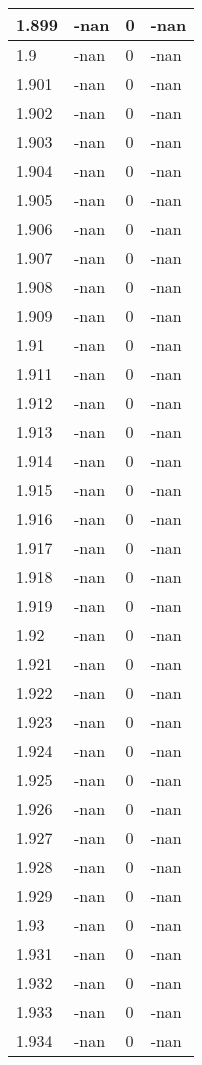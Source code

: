 \documentclass[a4paper,14pt]{extarticle}
\begin{document}
\begin{longtable}{||m{3cm}||m{3cm}|m{3cm}||m{3cm}||}
\hline
1.899 & -nan & 0 & -nan\\
\hline
1.9 & -nan & 0 & -nan\\
\hline
1.901 & -nan & 0 & -nan\\
\hline
1.902 & -nan & 0 & -nan\\
\hline
1.903 & -nan & 0 & -nan\\
\hline
1.904 & -nan & 0 & -nan\\
\hline
1.905 & -nan & 0 & -nan\\
\hline
1.906 & -nan & 0 & -nan\\
\hline
1.907 & -nan & 0 & -nan\\
\hline
1.908 & -nan & 0 & -nan\\
\hline
1.909 & -nan & 0 & -nan\\
\hline
1.91 & -nan & 0 & -nan\\
\hline
1.911 & -nan & 0 & -nan\\
\hline
1.912 & -nan & 0 & -nan\\
\hline
1.913 & -nan & 0 & -nan\\
\hline
1.914 & -nan & 0 & -nan\\
\hline
1.915 & -nan & 0 & -nan\\
\hline
1.916 & -nan & 0 & -nan\\
\hline
1.917 & -nan & 0 & -nan\\
\hline
1.918 & -nan & 0 & -nan\\
\hline
1.919 & -nan & 0 & -nan\\
\hline
1.92 & -nan & 0 & -nan\\
\hline
1.921 & -nan & 0 & -nan\\
\hline
1.922 & -nan & 0 & -nan\\
\hline
1.923 & -nan & 0 & -nan\\
\hline
1.924 & -nan & 0 & -nan\\
\hline
1.925 & -nan & 0 & -nan\\
\hline
1.926 & -nan & 0 & -nan\\
\hline
1.927 & -nan & 0 & -nan\\
\hline
1.928 & -nan & 0 & -nan\\
\hline
1.929 & -nan & 0 & -nan\\
\hline
1.93 & -nan & 0 & -nan\\
\hline
1.931 & -nan & 0 & -nan\\
\hline
1.932 & -nan & 0 & -nan\\
\hline
1.933 & -nan & 0 & -nan\\
\hline
1.934 & -nan & 0 & -nan\\

\end{longtable}
\end{document}
